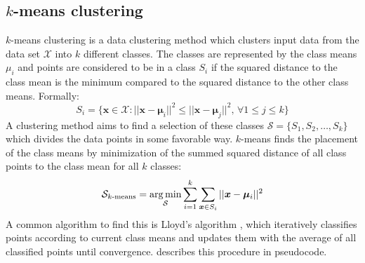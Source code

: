 
\subsection{$k$-means clustering}
$k$-means clustering is a data clustering method
which clusters input data from the data set $\mathcal{X}$ into $k$ different classes.
The classes are represented by the class means $\mu_i$ and points are considered to be in a class $S_i$
if the squared distance to the class mean is the minimum
compared to the squared distance to the other class means.
Formally:
\[
      S_i = \{ \bm{x} \in \mathcal{X}
   :  ||\bm{x} - \bm{\mu}_i||^2 \leq ||\bm{x} - \bm{\mu}_j||^2
  ,\, \forall 1 \leq j \leq k \}
\]
A clustering method aims to find a selection of these classes
$\mathcal{S} = \{S_1, S_2, \ldots, S_k\}$
which divides the data points in some favorable way.
$k$-means finds the placement of the class means
by minimization of the summed squared distance of all class points to the class mean for all $k$ classes:
\[
  \mathcal{S}_{k\text{-means}}
  = \operatorname*{arg\,min}_\mathcal{S} \sum_{i=1}^k \sum_{\bm{x} \in S_i} ||\bm{x} - \bm{\mu}_i||^2
\]
A common algorithm to find this is Lloyd's algorithm \cite{lloyd},
which iteratively classifies points according to current class means
and updates them with the average of all classified points until convergence.
 describes this procedure in pseudocode.

